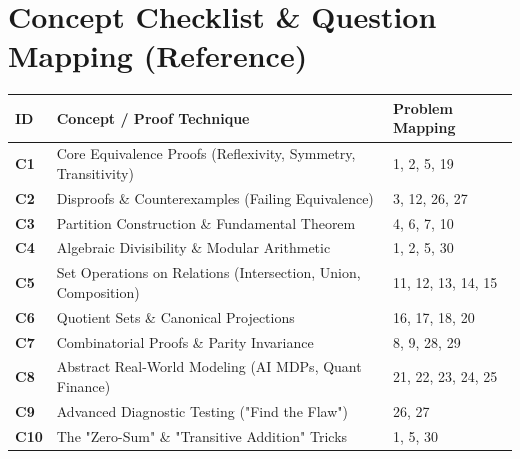 \documentclass[11pt, a4paper]{article}
\theoremstyle{definition}
\theoremstyle{remark}
\begin{document}
\newpage

\section{Concept Checklist \& Question Mapping (Reference)}
\label{sec:checklist_end}

\renewcommand{\arraystretch}{1.5}
\noindent
\begin{tabularx}{\textwidth}{>{\bfseries}l X l}
\toprule
ID & Concept / Proof Technique & Problem Mapping \\
\midrule
C1 & Core Equivalence Proofs (Reflexivity, Symmetry, Transitivity) & 1, 2, 5, 19 \\
C2 & Disproofs \& Counterexamples (Failing Equivalence) & 3, 12, 26, 27 \\
C3 & Partition Construction \& Fundamental Theorem & 4, 6, 7, 10 \\
C4 & Algebraic Divisibility \& Modular Arithmetic & 1, 2, 5, 30 \\
C5 & Set Operations on Relations (Intersection, Union, Composition) & 11, 12, 13, 14, 15 \\
C6 & Quotient Sets \& Canonical Projections & 16, 17, 18, 20 \\
C7 & Combinatorial Proofs \& Parity Invariance & 8, 9, 28, 29 \\
C8 & Abstract Real-World Modeling (AI MDPs, Quant Finance) & 21, 22, 23, 24, 25 \\
C9 & Advanced Diagnostic Testing ("Find the Flaw") & 26, 27 \\
C10 & The "Zero-Sum" \& "Transitive Addition" Tricks & 1, 5, 30 \\
\bottomrule
\end{tabularx}
\end{document}

